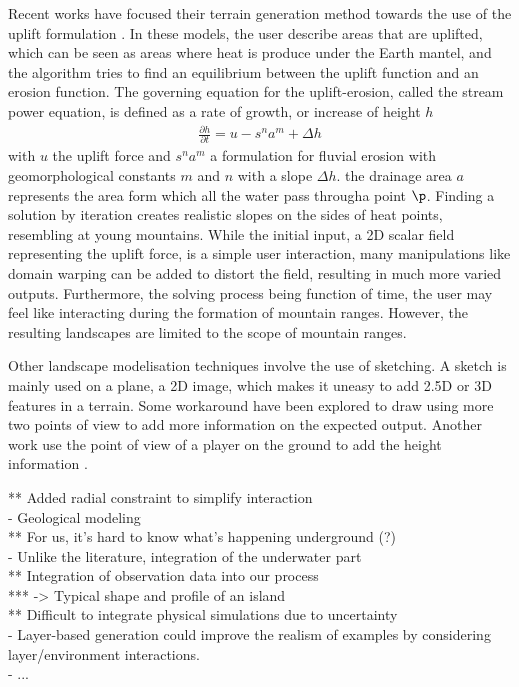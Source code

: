 Recent works have focused their terrain generation method towards the use of the uplift formulation \cite{Cordonnier2016,Cordonnier2017a,Schott2023,Tzathas2024}. In these models, the user describe areas that are uplifted, which can be seen as areas where heat is produce under the Earth mantel, and the algorithm tries to find an equilibrium between the uplift function and an erosion function. The governing equation for the uplift-erosion, called the stream power equation, is defined as a rate of growth, or increase of height $h$
\begin{align}
    \frac{\partial h}{\partial t} = u - s^n a^m + \Delta h
\end{align}
with $u$ the uplift force and $s^n a^m$ a formulation for fluvial erosion with geomorphological constants $m$ and $n$ with a slope $\Delta h$. the drainage area $a$ represents the area form which all the water pass througha point $\p$. Finding a solution by iteration creates realistic slopes on the sides of heat points, resembling at young mountains. While the initial input, a 2D scalar field representing the uplift force, is a simple user interaction, many manipulations like domain warping can be added to distort the field, resulting in much more varied outputs. Furthermore, the solving process being function of time, the user may feel like interacting during the formation of mountain ranges. However, the resulting landscapes are limited to the scope of mountain ranges.

Other landscape modelisation techniques involve the use of sketching. A sketch is mainly used on a plane, a 2D image, which makes it uneasy to add 2.5D or 3D features in a terrain. Some workaround have been explored to draw using more two points of view \cite{Gain2009} to add more information on the expected output. Another work use the point of view of a player on the ground to add the height information \cite{Tasse2014}. 

** Added radial constraint to simplify interaction \\
- Geological modeling \cite{Patel2021} \\
** For us, it's hard to know what's happening underground (?) \\
- Unlike the literature, integration of the underwater part \\
** Integration of observation data into our process \\
*** -> Typical shape and profile of an island \\
** Difficult to integrate physical simulations due to uncertainty \\
- Layer-based generation could improve the realism of examples by considering layer/environment interactions. \\
- ...


